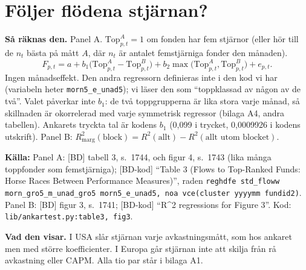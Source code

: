 \documentclass[10pt,a4paper]{article}
\newcommand{\kalla}[1]{\par\noindent\textbf{Källa:} #1\par}
\newcommand{\raknas}{\par\noindent\textbf{Så räknas den.} }
\newcommand{\visar}{\par\noindent\textbf{Vad den visar.} }
\newcommand{\kod}[1]{\texttt{#1}}
\begin{document}
\section{Följer flödena stjärnan?}
\begin{table}[H]
\caption{Flows, star ratings and past returns. Panel A follows Table 3 of Ben-David et al.\ (2022). Each month the funds with five stars are compared with an equal number of top funds by each return measure. The coefficient is $b_1$ in a regression of monthly flow (percent of assets) on the difference between the two top-fund indicators and an indicator for being top-ranked by either; it equals half the difference in flow between funds that only the first and only the second measure rank at the top. $t$-statistics, in parentheses, use standard errors clustered by fund and month. Panel B follows their Figure 3: the $R^2$ of a regression of flow on month effects, the 18-month raw return and star-rating indicators, minus the $R^2$ without the block named. Samples: United States July 1997 to December 2011; Europe June 2019 to December 2025.}
\centering
\end{table}
\raknas Panel A. $\text{Top}^A_{p,t}=1$ om fonden har fem stjärnor (eller hör till de $n_t$ bästa på mått $A$, där $n_t$ är antalet femstjärniga fonder den månaden).
\begin{equation}
F_{p,t}=a+b_1\big(\text{Top}^A_{p,t}-\text{Top}^B_{p,t}\big)+b_2\max\big(\text{Top}^A_{p,t},\text{Top}^B_{p,t}\big)+e_{p,t}.
\end{equation}
Ingen månadseffekt. Den andra regressorn definieras inte i den kod vi har (variabeln heter \kod{morn5\_e\_unad5}); vi läser den som ``toppklassad av någon av de två''. Valet påverkar inte $b_1$: de två toppgrupperna är lika stora varje månad, så skillnaden är okorrelerad med varje symmetrisk regressor (bilaga A4, andra tabellen). Ankarets tryckta tal är kodens $b_1$ (0,099 i trycket, 0,0009926 i kodens utskrift). Panel B: $R^2_{\text{marg}}(\text{block})=R^2(\text{allt})-R^2(\text{allt utom blocket})$.
\kalla{Panel A: [BD] tabell 3, s.~1744, och figur 4, s.~1743 (lika många toppfonder som femstjärniga); [BD-kod] ``Table 3 (Flows to Top-Ranked Funds: Horse Races Between Performance Measures)'', raden \kod{reghdfe std\_floww morn\_gro5\_m\_unad\_gro5 morn5\_e\_unad5, noa vce(cluster yyyymm fundid2)}. Panel B: [BD] figur 3, s.~1741; [BD-kod] ``R\textasciicircum 2 regressions for Figure 3''. Kod: \kod{lib/ankartest.py:table3, fig3}.}
\visar I USA slår stjärnan varje avkastningsmått, som hos ankaret men med större koefficienter. I Europa går stjärnan inte att skilja från rå avkastning eller CAPM. Alla tio par står i bilaga A1.
\end{document}
